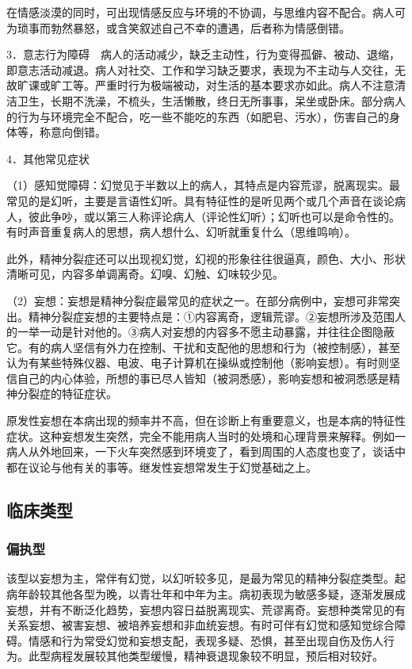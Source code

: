 在情感淡漠的同时，可出现情感反应与环境的不协调，与思维内容不配合。病人可为琐事而勃然暴怒，或含笑叙述自己不幸的遭遇，后者称为情感倒错。

3．意志行为障碍　病人的活动减少，缺乏主动性，行为变得孤僻、被动、退缩，即意志活动减退。病人对社交、工作和学习缺乏要求，表现为不主动与人交往，无故旷课或旷工等。严重时行为极端被动，对生活的基本要求亦如此。病人不注意清洁卫生，长期不洗澡，不梳头，生活懒散，终日无所事事，呆坐或卧床。部分病人的行为与环境完全不配合，吃一些不能吃的东西（如肥皂、污水），伤害自己的身体等，称意向倒错。

4．其他常见症状

（1）感知觉障碍：幻觉见于半数以上的病人，其特点是内容荒谬，脱离现实。最常见的是幻听，主要是言语性幻听。具有特征性的是听见两个或几个声音在谈论病人，彼此争吵，或以第三人称评论病人（评论性幻听）；幻听也可以是命令性的。有时声音重复病人的思想，病人想什么、幻听就重复什么（思维鸣响）。

此外，精神分裂症还可以出现视幻觉，幻视的形象往往很逼真，颜色、大小、形状清晰可见，内容多单调离奇。幻嗅、幻触、幻味较少见。

（2）妄想：妄想是精神分裂症最常见的症状之一。在部分病例中，妄想可非常突出。精神分裂症妄想的主要特点是：①内容离奇，逻辑荒谬。②妄想所涉及范围人的一举一动是针对他的。③病人对妄想的内容多不愿主动暴露，并往往企图隐蔽它。有的病人坚信有外力在控制、干扰和支配他的思想和行为（被控制感），甚至认为有某些特殊仪器、电波、电子计算机在操纵或控制他（影响妄想）。有时则坚信自己的内心体验，所想的事已尽人皆知（被洞悉感），影响妄想和被洞悉感是精神分裂症的特征症状。

原发性妄想在本病出现的频率并不高，但在诊断上有重要意义，也是本病的特征性症状。这种妄想发生突然，完全不能用病人当时的处境和心理背景来解释。例如一病人从外地回来，一下火车突然感到环境变了，看到周围的人态度也变了，谈话中都在议论与他有关的事等。继发性妄想常发生于幻觉基础之上。

\subsection{临床类型}

\subsubsection{偏执型}

该型以妄想为主，常伴有幻觉，以幻听较多见，是最为常见的精神分裂症类型。起病年龄较其他各型为晚，以青壮年和中年为主。病初表现为敏感多疑，逐渐发展成妄想，并有不断泛化趋势，妄想内容日益脱离现实、荒谬离奇。妄想种类常见的有关系妄想、被害妄想、被培养妄想和非血统妄想。有时可伴有幻觉和感知觉综合障碍。情感和行为常受幻觉和妄想支配，表现多疑、恐惧，甚至出现自伤及伤人行为。此型病程发展较其他类型缓慢，精神衰退现象较不明显，预后相对较好。

